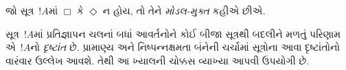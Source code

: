 
જો સૂત્ર~$!A$માં $\Box$ કે $\Diamond$ ન હોય,
તો તેને \emph{મોડલ-મુક્ત} કહીએ છીએ.
\endgroup

\begingroup
\makeatletter{}\makeatother


\label{guunit:OLP-0411}


સૂત્ર~$!A$માં પ્રતિજ્ઞાપન ચલનાં બધાં આવર્તનોને
કોઈ બીજા સૂત્રથી બદલીને મળતું પરિણામ એ~$!A$નો
\emph{દૃષ્ટાંત} છે. પ્રામાણ્ય અને નિષ્પન્નક્ષમતા બંનેની ચર્ચામાં
સૂત્રોના આવા દૃષ્ટાંતોનો વારંવાર ઉલ્લેખ આવશે. તેથી આ ખ્યાલની
ચોક્કસ વ્યાખ્યા આપવી ઉપયોગી છે.

